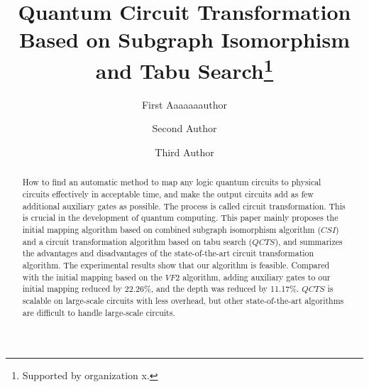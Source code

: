 \documentclass[runningheads]{llncs}
\begin{document}
%
\title{Quantum Circuit Transformation Based on Subgraph Isomorphism and Tabu Search\thanks{Supported by organization x.}}
%
%
\author{First Aaaaaaauthor \and
Second Author \and
Third Author}
%
%
%
\maketitle              %
%
\begin{abstract}
	How to find an automatic method to map any logic quantum circuits to
	physical circuits effectively in acceptable time, 
	and make the output circuits add as few additional auxiliary gates as possible. 
	The process is called circuit transformation.
	This is crucial in the development of quantum computing.
	This paper mainly proposes the initial mapping algorithm 
	based on combined subgraph isomorphism algorithm ($CSI$)
	and a circuit transformation algorithm based on tabu search ($QCTS$), 
	and summarizes the advantages and disadvantages of the state-of-the-art 
	circuit transformation algorithm.
	The experimental results show that our algorithm is feasible.
	Compared with the initial mapping based on the $VF2$ algorithm, 
	adding auxiliary gates to our initial mapping reduced by 22.26\%, and the depth was reduced by 11.17\%.
	$QCTS$ is scalable on large-scale circuits with less overhead,
	but other state-of-the-art algorithms are difficult to handle large-scale circuits. 
\end{abstract}
\end{document}
